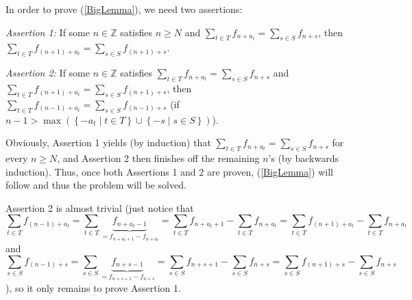 \documentclass[12pt,final,notitlepage,onecolumn]{article}%
\begin{document}
In order to prove (\ref{BigLemma}), we need two assertions:

\textit{Assertion 1:} If some $n\in\mathbb{Z}$ satisfies $n\geq N$ and
$\sum\limits_{t\in T}f_{n+a_{t}}=\sum\limits_{s\in S}f_{n+s}$, then
$\sum\limits_{t\in T}f_{\left(  n+1\right)  +a_{t}}=\sum\limits_{s\in
S}f_{\left(  n+1\right)  +s}$.

\textit{Assertion 2:} If some $n\in\mathbb{Z}$ satisfies $\sum\limits_{t\in
T}f_{n+a_{t}}=\sum\limits_{s\in S}f_{n+s}$ and $\sum\limits_{t\in T}f_{\left(
n+1\right)  +a_{t}}=\sum\limits_{s\in S}f_{\left(  n+1\right)  +s}$, then
$\sum\limits_{t\in T}f_{\left(  n-1\right)  +a_{t}}=\sum\limits_{s\in
S}f_{\left(  n-1\right)  +s}$ (if $n-1>\max\left(  \left\{  -a_{t}\mid t\in
T\right\}  \cup\left\{  -s\mid s\in S\right\}  \right)  $).

Obviously, Assertion 1 yields (by induction) that $\sum\limits_{t\in
T}f_{n+a_{t}}=\sum\limits_{s\in S}f_{n+s}$ for every $n\geq N$, and Assertion
2 then finishes off the remaining $n$'s (by backwards induction). Thus, once
both Assertions 1 and 2 are proven, (\ref{BigLemma}) will follow and thus the
problem will be solved.

Assertion 2 is almost trivial (just notice that%
\[
\sum\limits_{t\in T}f_{\left(  n-1\right)  +a_{t}}=\sum\limits_{t\in
T}\underbrace{f_{n+a_{t}-1}}_{=f_{n+a_{t}+1}-f_{n+a_{t}}}=\sum\limits_{t\in
T}f_{n+a_{t}+1}-\sum\limits_{t\in T}f_{n+a_{t}}=\sum\limits_{t\in T}f_{\left(
n+1\right)  +a_{t}}-\sum\limits_{t\in T}f_{n+a_{t}}%
\]
and%
\[
\sum\limits_{s\in S}f_{\left(  n-1\right)  +s}=\sum\limits_{s\in
S}\underbrace{f_{n+s-1}}_{=f_{n+s+1}-f_{n+s}}=\sum\limits_{s\in S}%
f_{n+s+1}-\sum\limits_{s\in S}f_{n+s}=\sum\limits_{s\in S}f_{\left(
n+1\right)  +s}-\sum\limits_{s\in S}f_{n+s}%
\]
), so it only remains to prove Assertion 1.
\end{document}
